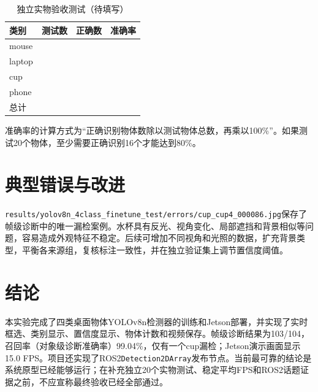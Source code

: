 \documentclass[UTF8,a4paper,12pt]{ctexart}
\begin{document}
\begin{table}[H]\centering\caption{独立实物验收测试（待填写）}\begin{tabular}{lrrr}\toprule 类别 & 测试数 & 正确数 & 准确率 \\\midrule
mouse & \underline{\hspace{1cm}} & \underline{\hspace{1cm}} & \underline{\hspace{1cm}}\\ laptop & \underline{\hspace{1cm}} & \underline{\hspace{1cm}} & \underline{\hspace{1cm}}\\ cup & \underline{\hspace{1cm}} & \underline{\hspace{1cm}} & \underline{\hspace{1cm}}\\ phone & \underline{\hspace{1cm}} & \underline{\hspace{1cm}} & \underline{\hspace{1cm}}\\\midrule 总计 & \underline{\hspace{1cm}} & \underline{\hspace{1cm}} & \underline{\hspace{1cm}}\\\bottomrule\end{tabular}\end{table}

准确率的计算方式为“正确识别物体数除以测试物体总数，再乘以100\%”。如果测试20个物体，至少需要正确识别16个才能达到80\%。

\section{典型错误与改进}
\texttt{results/yolov8n\_4class\_finetune\_test/errors/cup\_cup4\_000086.jpg}保存了帧级诊断中的唯一漏检案例。水杯具有反光、视角变化、局部遮挡和背景相似等问题，容易造成外观特征不稳定。后续可增加不同视角和光照的数据，扩充背景类型，平衡各来源组，复核标注一致性，并在独立验证集上调节置信度阈值。

\section{结论}
本实验完成了四类桌面物体YOLOv8n检测器的训练和Jetson部署，并实现了实时框选、类别显示、置信度显示、物体计数和视频保存。帧级诊断结果为103/104，召回率（对象级诊断准确率）99.04\%，仅有一个cup漏检；Jetson演示画面显示15.0 FPS。项目还实现了ROS2\texttt{Detection2DArray}发布节点。当前最可靠的结论是系统原型已经能够运行；在补充独立20个实物测试、稳定平均FPS和ROS2话题证据之前，不应宣称最终验收已经全部通过。
\end{document}

